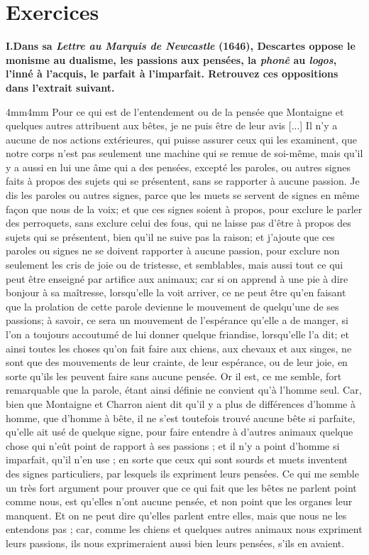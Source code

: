 \section*{Exercices}
\noindent\textbf{I.\quad Dans sa \textit{Lettre au Marquis de Newcastle} (1646), Descartes oppose le monisme au dualisme, les passions aux pensées, la \textit{phonê} au \textit{logos}, l’inné à l’acquis, le parfait à l’imparfait. Retrouvez ces oppositions dans l’extrait suivant.}
\begin{adjustwidth}{4mm}{4mm}\small
Pour ce qui est de l’entendement ou de la pensée que Montaigne et quelques autres attribuent aux bêtes, je ne puis être de leur avis [...] Il n’y a aucune de nos actions extérieures, qui puisse assurer ceux qui les examinent, que notre corps n’est pas seulement une machine qui se remue de soi-même, mais qu’il y a aussi en lui une âme qui a des pensées, excepté les paroles, ou autres signes faits à propos des sujets qui se présentent, sans se rapporter à aucune passion. Je dis les paroles ou autres signes, parce que les muets se servent de signes en même façon que nous de la voix; et que ces signes soient à propos, pour exclure le parler des perroquets, sans exclure celui des fous, qui ne laisse pas d’être à propos des sujets qui se présentent, bien qu’il ne suive pas la raison; et j’ajoute que ces paroles ou signes ne se doivent rapporter à aucune passion, pour exclure non seulement les cris de joie ou de tristesse, et semblables, mais aussi tout ce qui peut être enseigné par artifice aux animaux; car si on apprend à une pie à dire bonjour à sa maîtresse, lorsqu’elle la voit arriver, ce ne peut être qu’en faisant que la prolation de cette parole devienne le mouvement de quelqu’une de ses passions; à savoir, ce sera un mouvement de l’espérance qu’elle a de manger, si l’on a toujours accoutumé de lui donner quelque friandise, lorsqu’elle l’a dit; et ainsi toutes les choses qu’on fait faire aux chiens, aux chevaux et aux singes, ne sont que des mouvements de leur crainte, de leur espérance, ou de leur joie, en sorte qu’ils les peuvent faire sans aucune pensée. Or il est, ce me semble, fort remarquable que la parole, étant ainsi définie ne convient qu’à l’homme seul. Car, bien que Montaigne et Charron aient dit qu’il y a plus de différences d’homme à homme, que d’homme à bête, il ne s’est toutefois trouvé aucune bête si parfaite, qu’elle ait usé de quelque signe, pour faire entendre à d’autres animaux quelque chose qui n’eût point de rapport à ses passions ; et il n’y a point d’homme si imparfait, qu’il n’en use ; en sorte que ceux qui sont sourds et muets inventent des signes particuliers, par lesquels ils expriment leurs pensées. Ce qui me semble un très fort argument pour prouver que ce qui fait que les bêtes ne parlent point comme nous, est qu’elles n’ont aucune pensée, et non point que les organes leur manquent. Et on ne peut dire qu’elles parlent entre elles, mais que nous ne les entendons pas ; car, comme les chiens et quelques autres animaux nous expriment leurs passions, ils nous exprimeraient aussi bien leurs pensées, s’ils en avaient.
\end{adjustwidth}

